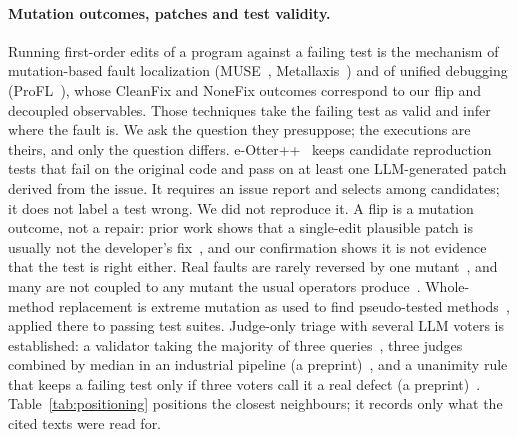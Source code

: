 \documentclass[pdflatex,iicol,sn-mathphys-num]{sn-jnl}
\begin{document}
\paragraph{Mutation outcomes, patches and test validity.} Running first-order edits of a program against a failing test is the mechanism of mutation-based fault localization (MUSE~\cite{moon2014muse}, Metallaxis~\cite{papadakis2015metallaxis}) and of unified debugging (ProFL~\cite{lou2020profl}), whose CleanFix and NoneFix outcomes correspond to our flip and decoupled observables. Those techniques take the failing test as valid and infer where the fault is. We ask the question they presuppose; the executions are theirs, and only the question differs. e-Otter++~\cite{ahmed2026eotter} keeps candidate reproduction tests that fail on the original code and pass on at least one LLM-generated patch derived from the issue. It requires an issue report and selects among candidates; it does not label a test wrong. We did not reproduce it. A flip is a mutation outcome, not a repair: prior work shows that a single-edit plausible patch is usually not the developer's fix~\cite{ghanbari2019prapr,qi2015plausibility}, and our confirmation shows it is not evidence that the test is right either. Real faults are rarely reversed by one mutant~\cite{pearson2017fl}, and many are not coupled to any mutant the usual operators produce~\cite{just2014mutants}. Whole-method replacement is extreme mutation as used to find pseudo-tested methods~\cite{niedermayr2016will,vera2018pseudo}, applied there to passing test suites. Judge-only triage with several LLM voters is established: a validator taking the majority of three queries~\cite{wang2025json}, three judges combined by median in an industrial pipeline (a preprint)~\cite{becker2026jit}, and a unanimity rule that keeps a failing test only if three voters call it a real defect (a preprint)~\cite{zhang2026testagent}. Table~\ref{tab:positioning} positions the closest neighbours; it records only what the cited texts were read for.
\end{document}

